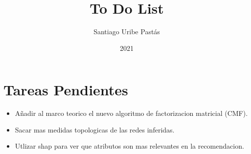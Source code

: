 \documentclass{article}
\title{To Do List}
\author{Santiago Uribe Pastás}
\date{2021}
\begin{document}
\maketitle

\section{Tareas Pendientes}
\begin{itemize}
    \item Añadir al marco teorico el nuevo algoritmo de factorizacion matricial (CMF).
    \item Sacar mas medidas topologicas de las redes inferidas.
    \item Utlizar shap para ver que atributos son mas relevantes en la recomendacion.
\end{itemize}
\end{document}
